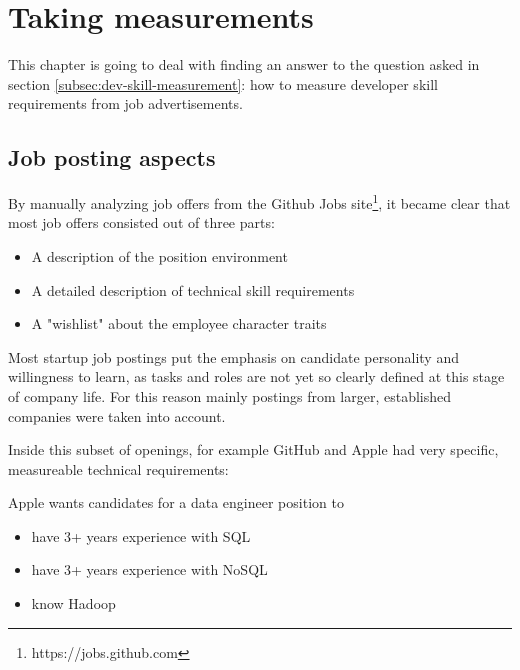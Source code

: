 \chapter{Taking measurements}
This chapter is going to deal with finding an answer
to the question asked in section \ref{subsec:dev-skill-measurement}:
how to measure developer skill requirements from job advertisements.

%

\section{Job posting aspects}
By manually analyzing job offers from the Github Jobs
site\footnote{https://jobs.github.com}, it became clear that most
job offers consisted out of three parts:

\begin{itemize}
\item A description of the position environment
\item A detailed description of technical skill requirements
\item A "wishlist" about the employee character traits
\end{itemize}

Most startup job postings put the emphasis on candidate personality and
willingness to learn, as tasks and roles are not yet so clearly defined
at this stage of company life. For this reason mainly postings from larger, established companies were taken into account.
\newline

Inside this subset of openings, for example GitHub and Apple had very
specific, measureable technical requirements:
\newline

Apple wants candidates for a data engineer position to
\begin{itemize}
    \item have 3+ years experience with SQL
    \item have 3+ years experience with NoSQL
    \item know Hadoop
\end{itemize}


